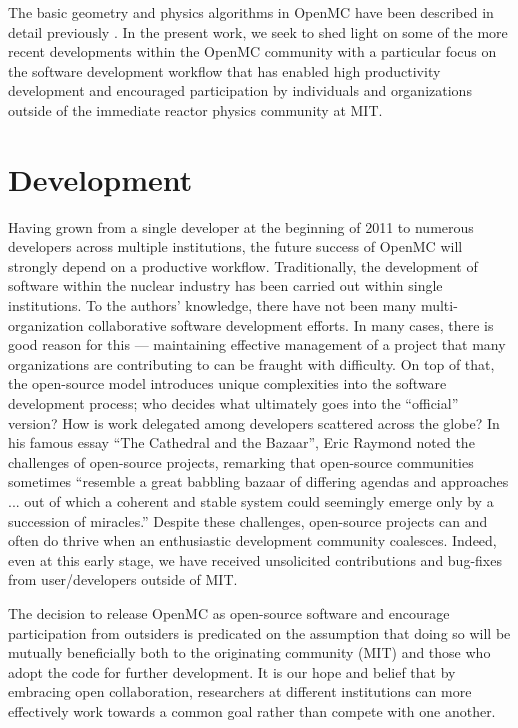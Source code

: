 \documentclass{ansconf}
\begin{document}
The basic geometry and physics algorithms in OpenMC have been described in
detail previously \cite{ane-romano-2012}. In the present work, we seek to shed
light on some of the more recent developments within the OpenMC community with a
particular focus on the software development workflow that has enabled high
productivity development and encouraged participation by individuals and
organizations outside of the immediate reactor physics community at MIT.

\section{Development}

Having grown from a single developer at the beginning of 2011 to numerous
developers across multiple institutions, the future success of OpenMC will
strongly depend on a productive workflow. Traditionally, the development of
software within the nuclear industry has been carried out within single
institutions. To the authors' knowledge, there have not been many
multi-organization collaborative software development efforts. In many cases,
there is good reason for this --- maintaining effective management of a project
that many organizations are contributing to can be fraught with difficulty. On
top of that, the open-source model introduces unique complexities into the
software development process; who decides what ultimately goes into the
``official'' version? How is work delegated among developers scattered across
the globe?  In his famous essay ``The Cathedral and the Bazaar'', Eric Raymond
noted the challenges of open-source projects, remarking that \cite{raymond-1999}
open-source communities sometimes ``resemble a great babbling bazaar of
differing agendas and approaches ... out of which a coherent and stable system
could seemingly emerge only by a succession of miracles.'' Despite these
challenges, open-source projects can and often do thrive when an enthusiastic
development community coalesces. Indeed, even at this early stage, we have
received unsolicited contributions and bug-fixes from user/developers outside of
MIT.

The decision to release OpenMC as open-source software and encourage
participation from outsiders is predicated on the assumption that doing so will
be mutually beneficially both to the originating community (MIT) and those who
adopt the code for further development. It is our hope and belief that by
embracing open collaboration, researchers at different institutions can more
effectively work towards a common goal rather than compete with one another.
\end{document}

